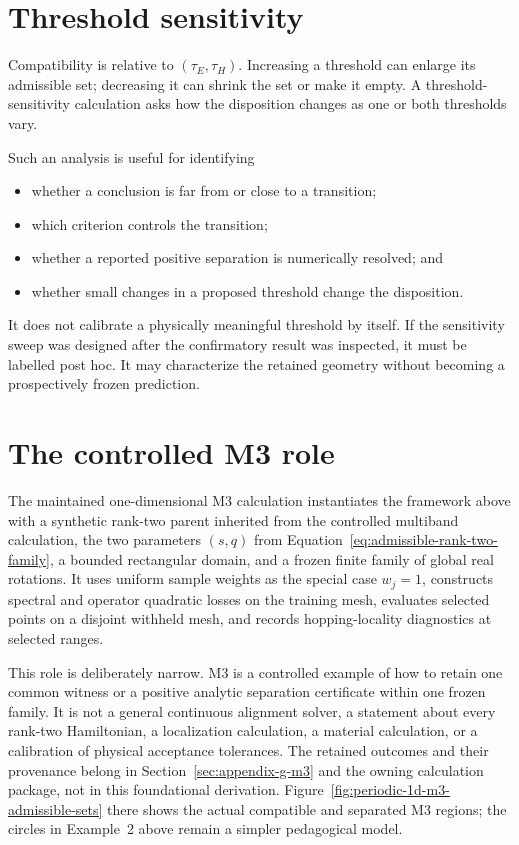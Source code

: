 \section{Threshold sensitivity}

Compatibility is relative to $(\tau_E,\tau_H)$. Increasing a threshold can
enlarge its admissible set; decreasing it can shrink the set or make it empty.
A threshold-sensitivity calculation asks how the disposition changes as one or
both thresholds vary.

Such an analysis is useful for identifying
\begin{itemize}
  \item whether a conclusion is far from or close to a transition;
  \item which criterion controls the transition;
  \item whether a reported positive separation is numerically resolved; and
  \item whether small changes in a proposed threshold change the disposition.
\end{itemize}
It does not calibrate a physically meaningful threshold by itself. If the
sensitivity sweep was designed after the confirmatory result was inspected, it
must be labelled post hoc. It may characterize the retained geometry without
becoming a prospectively frozen prediction.

\section{The controlled M3 role}

The maintained one-dimensional M3 calculation instantiates the framework above
with a synthetic rank-two parent inherited from the controlled multiband
calculation, the two parameters $(s,q)$ from
Equation~\eqref{eq:admissible-rank-two-family}, a bounded rectangular domain,
and a frozen finite family of global real rotations. It uses uniform sample
weights as the special case $w_j=1$, constructs spectral and operator quadratic
losses on the training mesh, evaluates selected points
on a disjoint withheld mesh, and records hopping-locality diagnostics at
selected ranges.

This role is deliberately narrow. M3 is a controlled example of how to retain
one common witness or a positive analytic separation certificate within one
frozen family. It is not a general continuous alignment solver, a statement
about every rank-two Hamiltonian, a localization calculation, a material
calculation, or a calibration of physical acceptance tolerances. The retained
outcomes and their provenance belong in
Section~\ref{sec:appendix-g-m3} and the owning calculation package, not in this
foundational derivation. Figure~\ref{fig:periodic-1d-m3-admissible-sets} there
shows the actual compatible and separated M3 regions; the circles in
Example~2 above remain a simpler pedagogical model.

